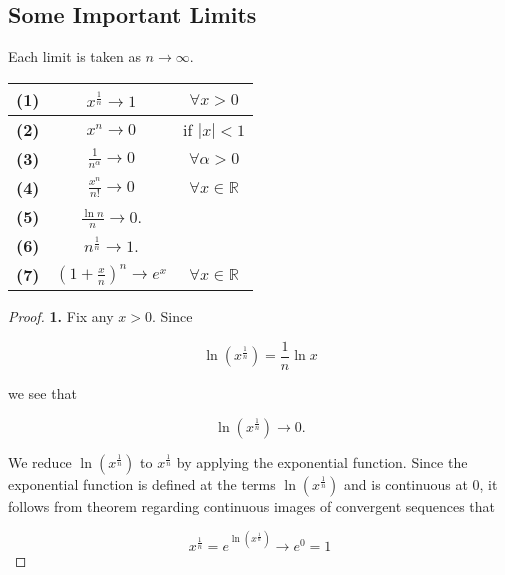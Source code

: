     \pagebreak
    \subsection{Some Important Limits}      %

        Each limit is taken as $n\to\infty$.

        \begin{center}
            \begin{tabular}{|c|c|c|}
                \hline
                \textbf{(1)}    & $x^{\frac{1}{n}}\to 1$                    & $\forall x > 0$ \\
                \hline
                \textbf{(2)}    & $x^n \to 0$                               & if $|x| < 1$ \\
                \hline
                \textbf{(3)}    & $\frac{1}{n^{\alpha}}\to 0$               & $\forall \alpha > 0$ \\
                \hline
                \textbf{(4)}    & $\frac{x^n}{n!}\to 0$                     & $\forall x\in \mathbb{R}$ \\
                \hline
                \textbf{(5)}    & $\frac{\ln{n}}{n}\to 0$.                  & \\
                \hline
                \textbf{(6)}    & $n^{\frac{1}{n}} \to 1$.                  & \\
                \hline
                \textbf{(7)}    & $\left(1+\frac{x}{n}\right)^n \to e^x$    & $\forall x\in\mathbb{R}$ \\
                \hline
            \end{tabular}
        \end{center}

        \begin{proof}
            \textbf{1.} Fix any $x > 0$. Since

            \[
                \ln{\left(x^{\frac{1}{n}}\right)} = \frac{1}{n}\ln{x}
            \]

            we see that

            \[
                \ln{\left(x^{\frac{1}{n}}\right)}\to 0.
            \]

            We reduce $\ln{\left(x^{\frac{1}{n}}\right)}$ to $x^{\frac{1}{n}}$ by applying the exponential function. Since the exponential function is defined at the terms $\ln{\left(x^{\frac{1}{n}}\right)}$ and is
            continuous at 0, it follows from theorem regarding continuous images of convergent sequences that

            \[
                x^{\frac{1}{n}} = e^{\ln{\left(x^{\frac{1}{n}}\right)}} \to e^0 = 1
            \]
        \end{proof}

